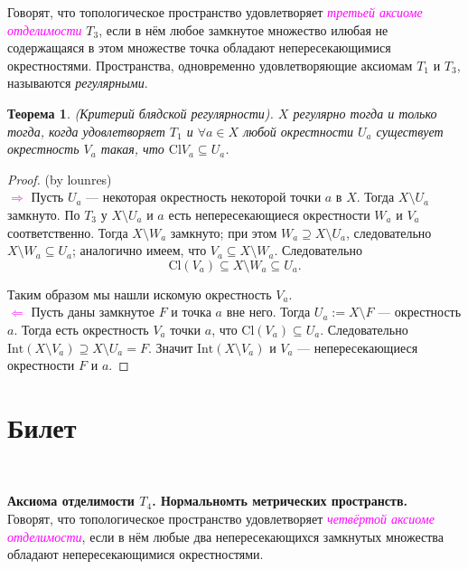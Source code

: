 \documentclass[a4paper,100pt]{article}
\theoremstyle{indented}
\newtheorem{theorem}{Теорема}
\begin{document}
Говорят, что топологическое пространство удовлетворяет \textcolor{magenta}{\textit{третьей аксиоме отделимости}} $T_3$, если в нём любое замкнутое множество илюбая не содержащаяся в этом множестве точка обладают непересекающимися окрестностями. Пространства, одновременно удовлетворяющие аксиомам $T_1$ и $T_3$, называются \textit{регулярными}.\\

\begin{theorem}
    (Критерий блядской регулярности). $X$ регулярно тогда и только тогда, когда удовлетворяет $T_1$ и $\forall a\in X $ любой окрестности $U_a$ существует окрестность $V_a$ такая, что $\text{Cl}V_a\subseteq U_a$.
\end{theorem}

\begin{proof}

    (by lounres)\\

    \textcolor{magenta}{$\Rightarrow$} Пусть $U_a$ --- некоторая окрестность некоторой точки $a$ в $X$. Тогда $X \setminus U_a$ замкнуто. По $T_3$ у $X \setminus U_a$ и $a$ есть непересекающиеся окрестности $W_a$ и $V_a$ соответственно. Тогда $X \setminus W_a$ замкнуто; при этом $W_a \supseteq X \setminus U_a$, следовательно $X \setminus W_a \subseteq U_a$; аналогично имеем, что $V_a \subseteq X \setminus W_a$. Следовательно
        \[
            \text{Cl}(V_a) \subseteq X \setminus W_a \subseteq U_a.
        \]
    
    Таким образом мы нашли искомую окрестность $V_a$.\\

    \textcolor{magenta}{$\Leftarrow$} Пусть даны замкнутое $F$ и точка $a$ вне него. Тогда $U_a := X \setminus F$ --- окрестность $a$. Тогда есть окрестность $V_a$ точки $a$, что $\text{Cl}(V_a) \subseteq U_a$. Следовательно $\text{Int}(X \setminus V_a) \supseteq X \setminus U_a = F$. Значит $\text{Int}(X \setminus V_a)$ и $V_a$ --- непересекающиеся окрестности $F$ и $a$.
\end{proof}


\section{Билет} \

\medskip

\textbf{Аксиома отделимости $T_4$. Нормальномть метрических пространств.}\\
        
    Говорят, что топологическое пространство удовлетворяет \textit{\textcolor{magenta}{четвёртой аксиоме отделимости}}, если в нём любые два непересекающихся замкнутых множества обладают непересекающимися окрестностями. \\
    
\end{document}
